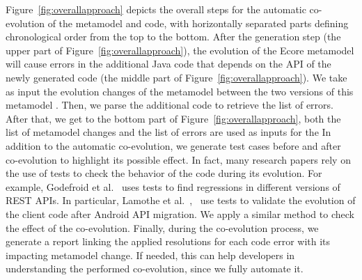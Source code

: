 Figure~\ref{fig:overallapproach} depicts the overall steps for the automatic co-evolution of the metamodel and code, with horizontally separated parts defining chronological order from the top to the bottom.
After the generation step (the upper part of Figure~\ref{fig:overallapproach}), the evolution of the Ecore metamodel will cause errors in the additional Java code that depends on the API of the newly generated code (the middle part of Figure~\ref{fig:overallapproach}). We take as input the evolution changes of the metamodel between the two versions of this metamodel {\small{}}. Then, we parse the additional code  {\small{}} to retrieve the list of errors. 
After that, we get to the bottom part of Figure~\ref{fig:overallapproach}, both the list of metamodel changes and the list of errors are used as inputs for the  
In addition to the automatic co-evolution, we generate test cases before and after co-evolution to highlight its possible effect. In fact, many research papers rely on the use of tests to check the behavior of the code during its evolution. For example, Godefroid et al.~\cite{10.1145/3395363.3397374} uses tests to find regressions in different versions of REST APIs. In particular, Lamothe et al.~\cite{9079197},~\cite{10.1145/3387905.3388608} use tests to validate the evolution of the client code after Android API migration. We apply a similar method to check the effect of the co-evolution. 
Finally, during the co-evolution process, we generate a report linking the applied resolutions for each code error with its impacting metamodel change. If needed, this can help developers in understanding the performed co-evolution, since we fully automate it.
